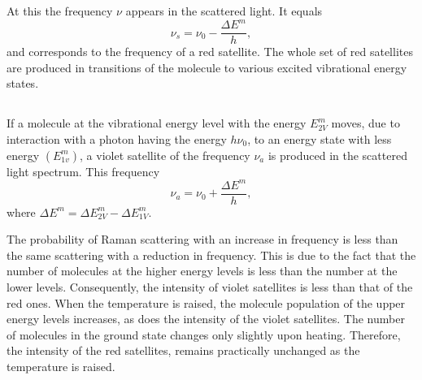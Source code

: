 At this the frequency $\nu$ appears in the scattered light. It equals 
\begin{equation*}%
\nu_{s} = \nu_{0} - \frac{\Delta E^{m}}{h},
\end{equation*}
and corresponds to the frequency of a red satellite. The whole set of red satellites are produced in transitions of the molecule to various excited vibrational energy states.

\subsection{}\label{39.6.3} If a molecule at the vibrational energy level with the energy $E^{m}_{2V}$  moves, due to interaction with a photon having the energy $h \nu_{0}$, to an energy state with less energy $(E^{m}_{1v})$, a violet satellite of the frequency $\nu_{a}$ is produced in the scattered light spectrum. This frequency
\begin{equation*}%
\nu_{a} = \nu_{0} + \frac{\Delta E^{m}}{h},
\end{equation*}
where $\Delta E^{m} = \Delta E^{m}_{2V} - \Delta E^{m}_{1V}$.

The probability of Raman scattering with an increase in frequency is less than the same scattering with a reduction in frequency. This is due to the fact that the number of molecules at the higher energy levels is less than the number at the lower levels. Consequently, the intensity of violet satellites is less than that of the red ones. When the temperature is raised, the molecule population of the upper energy levels increases, as does the intensity of the violet satellites. The number of molecules in the ground state changes only slightly upon heating. Therefore, the intensity of the red satellites, remains practically unchanged as the  temperature is raised.

